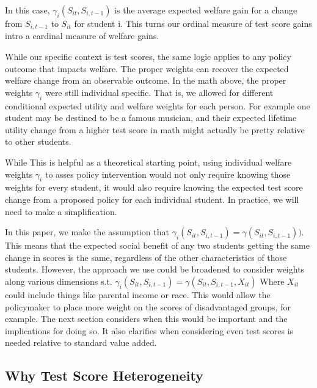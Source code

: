 \documentclass{article}
\theoremstyle{definition}
\theoremstyle{definition}
\theoremstyle{definition}
\theoremstyle{definition}
\begin{document}
    In this case, $\gamma_i(S_{it}, S_{i,t-1})$ is the average expected welfare gain for a change from $S_{i,t-1}$ to $S_{it}$ for student i. This turns our ordinal measure of test score gains intro a cardinal measure of welfare gains. 
 

    While our specific context is test scores, the same logic applies to any policy outcome that impacts welfare. The proper weights can recover the expected welfare change from an observable outcome. In the math above, the proper weights  $\gamma_i$ were still individual specific. That is, we allowed for different conditional expected utility and welfare weights for each person. For example one student may be destined to be a famous musician, and their expected lifetime utility change from a higher test score in math might actually be pretty relative to other students. 
    
    While This is helpful as a theoretical starting point, using individual welfare weights  $\gamma_i$ to asses policy intervention would not only require knowing those weights for every student, it would also require knowing the expected test score change from a proposed policy for each individual student. In practice, we will need to make a simplification.
    
    In this paper, we make the assumption that $\gamma_i(S_{it}, S_{i,t-1}) = \gamma(S_{it}, S_{i,t-1}))$. This means that the expected social benefit of any two students getting the same change in scores is the same, regardless of the other characteristics of those students. However, the approach we use could be broadened to consider weights along various dimensions s.t. $\gamma_i(S_{it}, S_{i,t-1}) = \gamma(S_{it}, S_{i,t-1}, X_{it})$ Where $X_{it}$ could include things like parental income or race. This would allow the policymaker to place more weight on the scores of disadvantaged groups, for example. The next section considers when this would be important and the implications for doing so. It also clarifies when considering even test scores is needed relative to standard value added. 
    

    
    \subsection{Why Test Score Heterogeneity}
    
    
\end{document}

